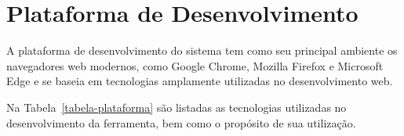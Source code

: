 \chapter{Plataforma de Desenvolvimento}
\label{sec-plataforma}
\vspace{-1cm}



A plataforma de desenvolvimento do sistema \emph{\imprimirtitulo} tem como seu principal ambiente os navegadores web modernos, como Google Chrome, Mozilla Firefox e Microsoft Edge e se baseia em tecnologias amplamente utilizadas no desenvolvimento web.

Na Tabela~\ref{tabela-plataforma} são listadas as tecnologias utilizadas no desenvolvimento da ferramenta, bem como o propósito de sua utilização.


